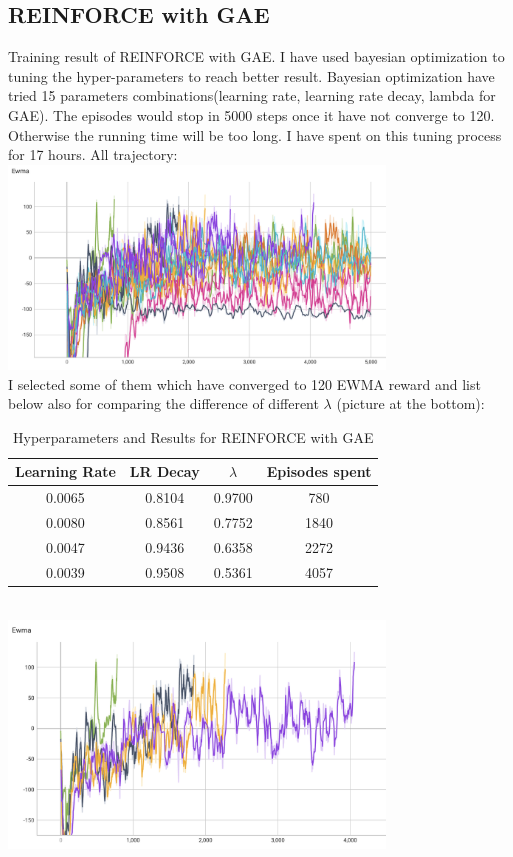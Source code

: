 \documentclass{article} %
\begin{document}
    \subsection{REINFORCE with GAE}
    Training result of REINFORCE with GAE. I have used bayesian optimization to tuning the hyper-parameters to reach better result.
    Bayesian optimization have tried 15 parameters combinations(learning rate, learning rate decay, lambda for GAE). The episodes would stop in 5000 steps once it have not converge to 120.
    Otherwise the running time will be too long. I have spent on this tuning process for 17 hours. All trajectory:\\
    \includegraphics[width=10cm]{./imgs/all.png} \\
    I selected some of them which have converged to 120 EWMA reward and list below also for comparing the difference of different $\lambda$ (picture at the bottom): \\
    \begin{table}[h]
        \centering
        \begin{tabular}{|c|c|c|c|}
        \hline
        \textbf{Learning Rate} & \textbf{LR Decay} & \textbf{$\lambda$} & \textbf{Episodes spent} \\ \hline
        0.0065 & 0.8104 & 0.9700 & 780  \\ \hline
        0.0080 & 0.8561 & 0.7752 & 1840 \\ \hline
        0.0047 & 0.9436 & 0.6358 & 2272 \\ \hline
        0.0039 & 0.9508 & 0.5361 & 4057 \\ \hline
        \end{tabular}
        \caption{Hyperparameters and Results for REINFORCE with GAE}
        \label{tab:gae_results}
    \end{table}
    \\
    \includegraphics[width=10cm]{./imgs/four_line.png} \\
    
\end{document}
